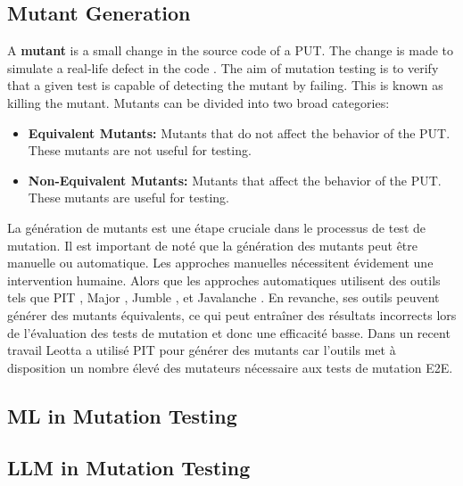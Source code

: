 \label{sec:background}

\subsection{Mutant Generation}
A \textbf{mutant} is a small change in the source code of a PUT. The change is made to simulate a
real-life defect in the code \cite{offutt2001mutation, jia2010analysis}. The aim of mutation testing is to verify that a given test is capable of detecting the mutant by failing. This is known as killing the mutant. Mutants can be divided into two broad categories:

\begin{itemize}
    \item \textbf{Equivalent Mutants:} Mutants that do not affect the behavior of
          the PUT. These mutants are not useful for testing.
    \item \textbf{Non-Equivalent Mutants:} Mutants that affect the behavior of the PUT. These mutants are useful for testing.
\end{itemize}

La génération de mutants est une étape cruciale dans le processus de test de
mutation. Il est important de noté que la génération des mutants
peut être manuelle ou automatique. Les approches manuelles nécessitent évidement
une intervention humaine. Alors que les approches automatiques utilisent des
outils tels que PIT \cite{leotta2024mutta, coles2016pit}, Major \cite{just2014major},
Jumble \cite{irvine2007jumble}, et Javalanche \cite{schuler2009javalanche}.
En revanche, ses outils peuvent générer des mutants équivalents, ce qui peut entraîner
des résultats incorrects lors de l'évaluation des tests de mutation et donc une
efficacité basse. Dans un recent travail Leotta \etal \cite{leotta2024mutta} a
utilisé PIT pour générer des mutants car l'outils met à disposition un nombre
élevé des mutateurs nécessaire aux tests de mutation E2E.


\subsection{ML in Mutation Testing}

\subsection{LLM in Mutation Testing}













